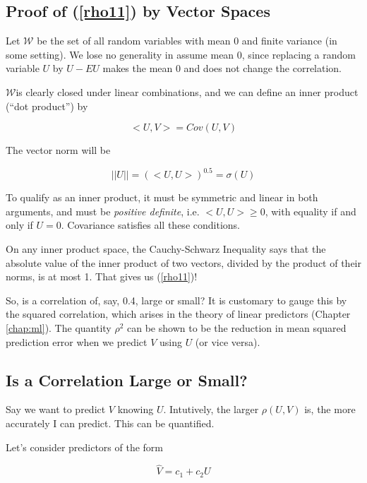 \subsection{Proof of (\ref{rho11}) by Vector Spaces}

Let $\mathcal{W}$ be the set of all random variables with mean 0 and
finite
variance (in some setting).  We lose no generality in assume mean 0,
since replacing a random variable $U$ by $U - EU$ makes the mean 0 and
does not change the correlation.

$\mathcal{W}$is clearly closed under linear combinations, and we can
define an inner product (``dot product'') by

\begin{equation}
<U,V> = Cov(U,V)
\end{equation}

The vector norm will be

\begin{equation}
||U|| = (<U,U>)^{0.5} = \sigma(U)
\end{equation}

To qualify as an inner product, it must be symmetric and linear in both
arguments, and must be \textit{positive definite}, i.e. $<U,U> \geq 0$,
with equality if and only if $U = 0$.  Covariance satisfies all these
conditions. 

On any inner product space, the Cauchy-Schwarz Inequality says that the
absolute value of the inner product of two vectors, divided by the
product of their norms, is at most 1.  That gives us (\ref{rho11})!

So, is a correlation of, say, 0.4, large or small?  It is customary to
gauge this by the squared correlation, which arises in the theory of
linear predictors (Chapter \ref{chap:ml}).  The quantity $\rho^2$ can be
shown to be the reduction in mean squared prediction error when we
predict $V$ using $U$ (or vice versa).

\subsection{Is a Correlation Large or Small?}

Say we want to predict $V$ knowing $U$.  Intutively, the larger
$\rho(U,V)$ is, the more accurately I can predict.  This can be quantified.

Let's consider predictors of the form

\begin{equation}
\label{predv}
\widehat{V} = c_1 + c_2 U
\end{equation}

